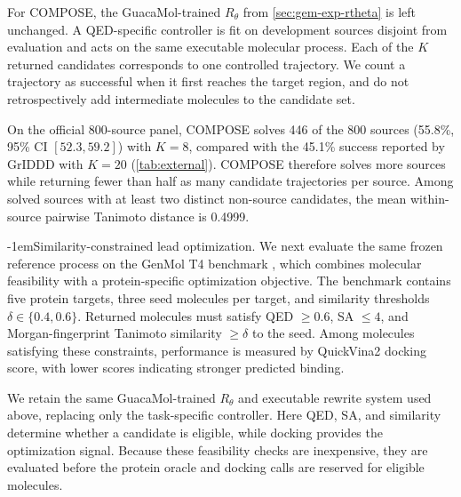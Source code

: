 \documentclass{article}
\makeatletter
\theoremstyle{definition}
\theoremstyle{remark}
\def\paragraph{\@startsection{paragraph}{4}{\z@}{1.0ex plus 0.3ex minus .2ex}%
  {-1em}{\normalsize\bf}}
\makeatother
\begin{document}
For COMPOSE, the GuacaMol-trained $R_\theta$ from \cref{sec:gem-exp-rtheta} is
left unchanged. A QED-specific controller is fit on development sources disjoint
from evaluation and acts on the same executable molecular process. Each of the
$K$ returned candidates corresponds to one controlled trajectory. We count a
trajectory as successful when it first reaches the target region, and do not
retrospectively add intermediate molecules to the candidate set.

On the official 800-source panel, COMPOSE solves 446 of the 800 sources
(55.8\%, 95\% CI $[52.3,59.2]$) with $K=8$, compared with the 45.1\% success
reported by GrIDDD with $K=20$ (\cref{tab:external}). COMPOSE therefore solves
more sources while returning fewer than half as many candidate trajectories per
source. Among solved sources with at least two distinct non-source candidates,
the mean within-source pairwise Tanimoto distance is 0.4999.

\paragraph{Similarity-constrained lead optimization.}
We next evaluate the same frozen reference process on the GenMol T4 benchmark
\citep{lee2025genmol}, which combines molecular feasibility with a
protein-specific optimization objective. The benchmark contains five protein
targets, three seed molecules per target, and similarity thresholds
$\delta\in\{0.4,0.6\}$. Returned molecules must satisfy QED $\geq 0.6$, SA
$\leq 4$, and Morgan-fingerprint Tanimoto similarity $\geq\delta$ to the seed.
Among molecules satisfying these constraints, performance is measured by
QuickVina2 docking score, with lower scores indicating stronger predicted
binding.

We retain the same GuacaMol-trained $R_\theta$ and executable rewrite system used
above, replacing only the task-specific controller. Here QED, SA, and similarity
determine whether a candidate is eligible, while docking provides the
optimization signal. Because these feasibility checks are inexpensive, they are
evaluated before the protein oracle and docking calls are reserved for eligible
molecules.
\end{document}
